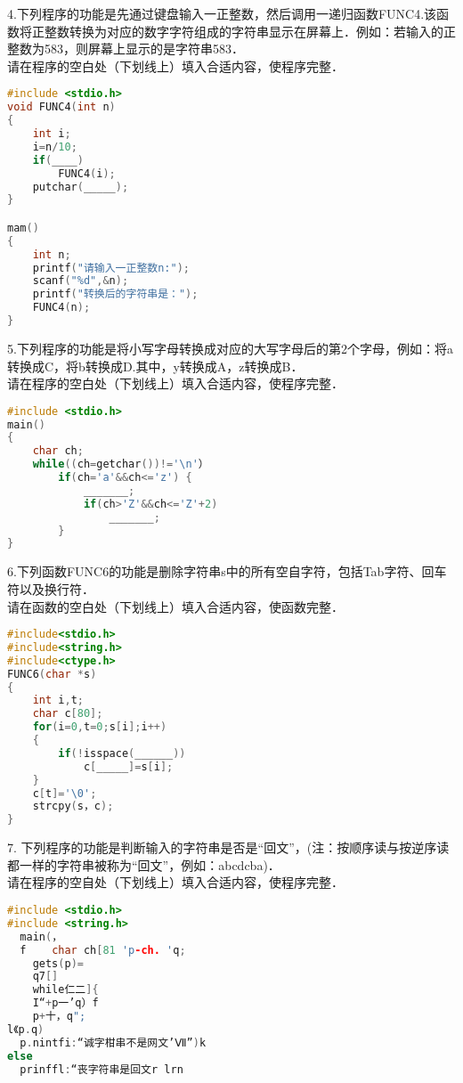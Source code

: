 4.下列程序的功能是先通过键盘输入一正整数，然后调用一递归函数FUNC4.该函数将正整数转换为对应的数字字符组成的字符串显示在屏幕上．例如：若输入的正整数为583，则屏幕上显示的是字符串583． \\
请在程序的空白处（下划线上）填入合适内容，使程序完整．
\begin{lstlisting}[language=cpp]
#include <stdio.h>
void FUNC4(int n)
{
    int i;
    i=n/10;
    if(____)
        FUNC4(i);
    putchar(_____);
}

mam()
{
    int n;
    printf("请输入一正整数n:");
    scanf("%d",&n);
    printf("转换后的字符串是：");
    FUNC4(n);
}
\end{lstlisting}

5.下列程序的功能是将小写字母转换成对应的大写字母后的第2个字母，例如：将a转换成C，将b转换成D.其中，y转换成A，z转换成B． \\
请在程序的空白处（下划线上）填入合适内容，使程序完整．
\begin{lstlisting}[language=cpp]
#include <stdio.h>
main()
{
    char ch;
    while((ch=getchar())!='\n'）
        if(ch='a'&&ch<='z') {
            _______;
            if(ch>'Z'&&ch<='Z'+2)
                _______;
        }
}
\end{lstlisting}
    
6.下列函数FUNC6的功能是删除字符串s中的所有空自字符，包括Tab字符、回车符以及换行符． \\
请在函数的空白处（下划线上）填入合适内容，使函数完整．
\begin{lstlisting}[language=cpp]
#include<stdio.h>
#include<string.h>
#include<ctype.h>
FUNC6(char *s)
{
    int i,t;
    char c[80];
    for(i=0,t=0;s[i];i++)
    {
        if(!isspace(______))
            c[_____]=s[i];
    }
    c[t]='\0';
    strcpy(s，c);
}
\end{lstlisting}

7. 下列程序的功能是判断输入的字符串是否是“回文”，(注：按顺序读与按逆序读都一样的字符串被称为“回文”，例如：abcdcba)． \\
请在程序的空自处（下划线上）填入合适内容，使程序完整．
\begin{lstlisting}[language=cpp]
#include <stdio.h>
#include <string.h>
  main(，
  f    char ch[81 'p-ch. 'q;
    gets(p)=
    q7[]
    while仁二]{
    I“+p一’q）f
    p+十，q";
l《p.q)
  p.nintfi:“诚字柑串不是网文’Ⅶ”)k
else
  prinffl:“丧字符串是回文r lrn
\end{lstlisting}
